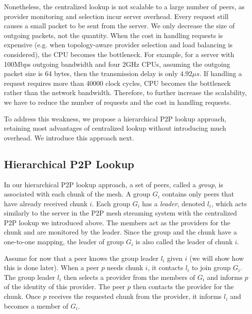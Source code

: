     Nonetheless, the centralized lookup is not scalable to a large
    number of peers, as provider monitoring and selection incur
    server overhead.  Every request still causes a small packet to be
    sent from the server.  We only decrease the size of outgoing 
    packets, not the quantity.   When
    the cost in handling requests is expensive
    (e.g. when topology-aware provider selection and load balancing is considered), 
    the CPU becomes the bottleneck. 
    For example, for a server with 100Mbps outgoing bandwidth and four 2GHz
    CPUs, assuming the outgoing packet size is 64 bytes, 
    then the transmission delay is only $4.92\mu{s}$. If 
    handling a request requires more than 40000 clock cycles, CPU becomes 
    the bottleneck rather than the network bandwidth. Therefore, to further increase the
    scalability, we have to reduce the number of requests and the
    cost in handling requests.
    
    To address this weakness, we propose a hierarchical P2P lookup approach,
    retaining most advantages of centralized lookup without 
    introducing much overhead.  We introduce this approach next.  

\subsection{Hierarchical P2P Lookup}
\label{s:hp2p}
    In our hierarchical P2P %
    lookup approach, a set of
    peers, called a \textit{group}, is associated with each
    chunk of the mesh.  A group $G_i$ contains only peers
    that have already received chunk $i$.  Each group
    $G_i$ has a \textit{leader}, denoted $l_i$, which acts
    similarly to the server in the 
    P2P mesh streaming system with the centralized P2P lookup we
    introduced
    above.  The members act as the providers for the chunk
    and are monitored by the leader.  Since the group and
    the chunk have a one-to-one mapping, the leader of group
    $G_i$ is also called the leader of chunk $i$.

    Assume for now that a peer knows the group leader $l_i$
    given $i$ (we will show how this is done later).  When a
    peer $p$ needs chunk $i$, it contacts $l_i$ to join
    group $G_i$.  The group leader $l_i$ then selects a
    provider from the members of $G_i$ and informs $p$ of the
    identity of this provider.  The peer $p$ then contacts the
    provider for the chunk.  Once %
    $p$ receives the
    requested chunk from the provider, it informs $l_i$ and
    becomes a member of $G_i$.

